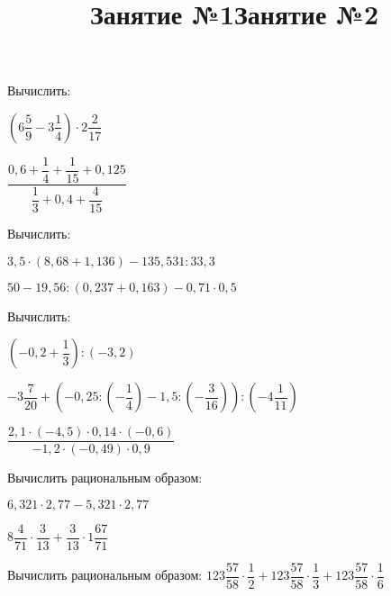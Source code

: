\title{Занятие №1}
\begin{listofex}
	\item Вычислить:
	\begin{enumcols}[itemcolumns=2]
		\item \( \left( 6\dfrac{5}{9}-3\dfrac{1}{4} \right)\cdot2\dfrac{2}{17} \)
		\item \( \dfrac{0,6+\dfrac{1}{4}+\dfrac{1}{15}+0,125}{\dfrac{1}{3}+0,4+\dfrac{4}{15}} \)
	\end{enumcols}
	\item Вычислить:
	\begin{enumcols}[itemcolumns=2]
		\item \( 3,5\cdot(8,68+1,136)-135,531:33,3 \)
		\item \( 50-19,56:(0,237+0,163)-0,71\cdot0,5 \)
	\end{enumcols}
	\item Вычислить:
	\begin{enumcols}[itemcolumns=1]
		\item \( \left( -0,2+\dfrac{1}{3} \right):(-3,2) \)
		\item \( -3\dfrac{7}{20}+\left( -0,25:\left( -\dfrac{1}{4} \right)-1,5:\left( -\dfrac{3}{16} \right) \right):\left( -4\dfrac{1}{11} \right) \)
		\item \( \dfrac{2,1\cdot(-4,5)\cdot0,14\cdot(-0,6)}{-1,2\cdot(-0,49)\cdot0,9} \)
	\end{enumcols}
	\item Вычислить рациональным образом:
	\begin{enumcols}[itemcolumns=2]
		\item \( 6,321\cdot2,77-5,321\cdot2,77 \)
		\item \( 8\dfrac{4}{71}\cdot\dfrac{3}{13}+\dfrac{3}{13}\cdot1\dfrac{67}{71} \)
	\end{enumcols}
	\item Вычислить рациональным образом: \( 123\dfrac{57}{58}\cdot\dfrac{1}{2}+123\dfrac{57}{58}\cdot\dfrac{1}{3}+123\dfrac{57}{58}\cdot\dfrac{1}{6} \)
\end{listofex}
\newpage
\title{Занятие №2}
